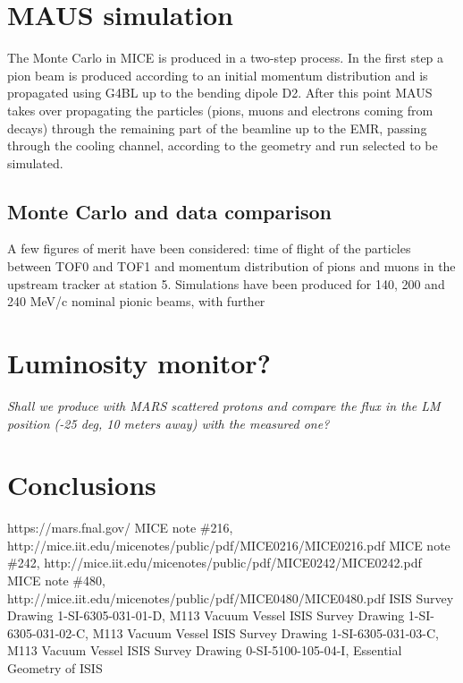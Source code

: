 \documentclass[a4paper,11pt]{article}
\begin{document}
\section{MAUS simulation}

The Monte Carlo in MICE is produced in a two-step process. In the first step a pion beam is produced according to an initial momentum distribution and is propagated using G4BL up to the bending dipole D2. After this point MAUS takes over propagating the particles (pions, muons and electrons coming from decays) through the remaining part of the beamline up to the EMR, passing through the cooling channel, according to the geometry and run selected to be simulated. 

\subsection{Monte Carlo and data comparison}

A few figures of merit have been considered: time of flight of the particles between TOF0 and TOF1 and momentum distribution of pions and muons in the upstream tracker at station 5.
Simulations have been produced for 140, 200 and 240 MeV/c nominal pionic beams, with further 

\section{Luminosity monitor?}
\textit{Shall we produce with MARS scattered protons and compare the flux in the LM position (-25 deg, 10 meters away) with the measured one?} 

\section{Conclusions}

\begin{thebibliography}{9}
 https://mars.fnal.gov/
 MICE note \#216, http://mice.iit.edu/micenotes/public/pdf/MICE0216/MICE0216.pdf
 MICE note \#242, http://mice.iit.edu/micenotes/public/pdf/MICE0242/MICE0242.pdf
 MICE note \#480, http://mice.iit.edu/micenotes/public/pdf/MICE0480/MICE0480.pdf
 ISIS Survey Drawing 1-SI-6305-031-01-D, M113 Vacuum Vessel
 ISIS Survey Drawing 1-SI-6305-031-02-C, M113 Vacuum Vessel
 ISIS Survey Drawing 1-SI-6305-031-03-C, M113 Vacuum Vessel
 ISIS Survey Drawing 0-SI-5100-105-04-I, Essential Geometry of ISIS

\end{thebibliography}





\end{document}
